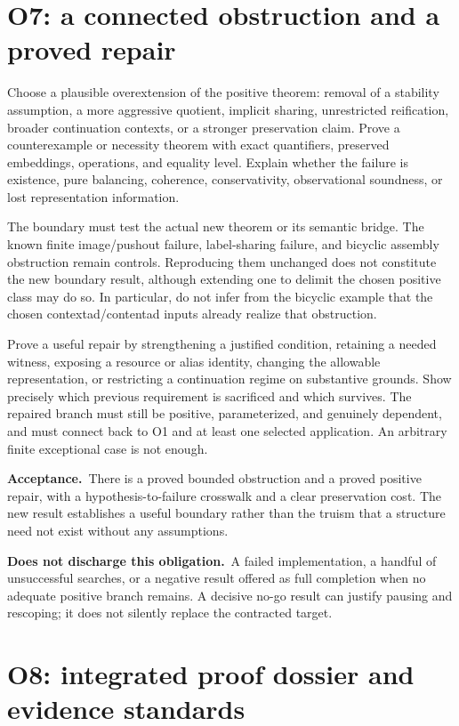 \documentclass[11pt,a4paper]{article}
\newcommand{\accept}{\par\textbf{Acceptance.}\ }
\newcommand{\notaccepted}{\par\textbf{Does not discharge this obligation.}\ }
\begin{document}
\section{O7: a connected obstruction and a proved repair}\label{sec:o7}

Choose a plausible overextension of the positive theorem: removal of a
stability assumption, a more aggressive quotient, implicit sharing,
unrestricted reification, broader continuation contexts, or a stronger
preservation claim. Prove a counterexample or necessity theorem with exact
quantifiers, preserved embeddings, operations, and equality level. Explain
whether the failure is existence, pure balancing, coherence, conservativity,
observational soundness, or lost representation information.

The boundary must test the actual new theorem or its semantic bridge. The
known finite image/pushout failure, label-sharing failure, and bicyclic
assembly obstruction remain controls. Reproducing them unchanged does not
constitute the new boundary result, although extending one to delimit the
chosen positive class may do so. In particular, do not infer from the
bicyclic example that the chosen contextad/contentad inputs already realize
that obstruction.

Prove a useful repair by strengthening a justified condition, retaining a
needed witness, exposing a resource or alias identity, changing the allowable
representation, or restricting a continuation regime on substantive grounds.
Show precisely which previous requirement is sacrificed and which survives.
The repaired branch must still be positive, parameterized, and genuinely
dependent, and must connect back to O1 and at least one selected application.
An arbitrary finite exceptional case is not enough.

\accept There is a proved bounded obstruction and a proved positive repair,
with a hypothesis-to-failure crosswalk and a clear preservation cost. The
new result establishes a useful boundary rather than the truism that a
structure need not exist without any assumptions.

\notaccepted A failed implementation, a handful of unsuccessful searches,
or a negative result offered as full completion when no adequate positive
branch remains. A decisive no-go result can justify pausing and rescoping;
it does not silently replace the contracted target.

\section{O8: integrated proof dossier and evidence standards}\label{sec:o8}
\end{document}
